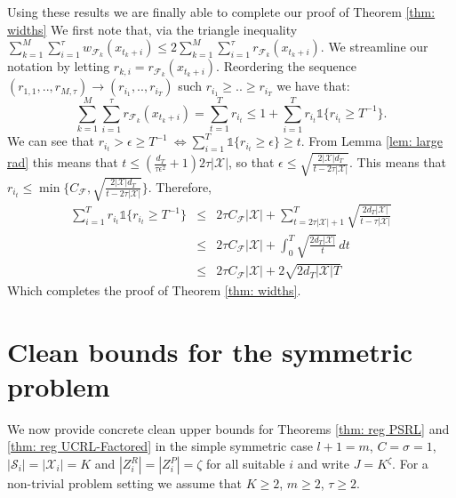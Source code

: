 \documentclass{article}
\newcommand{\Ind}{\mathds{1}}
\newcommand{\Xc}{\mathcal{X}}
\newcommand{\Fc}{\mathcal{F}}
\newcommand{\Sc}{\mathcal{S}}
\begin{document}
Using these results we are finally able to complete our proof of Theorem \ref{thm: widths}
We first note that, via the triangle inequality $ \sum_{k=1}^M \sum_{i=1}^\tau w_{\mathcal{F}_{k}}(x_{t_k+i}) \le 2 \sum_{k=1}^M \sum_{i=1}^\tau r_{\mathcal{F}_{k}}(x_{t_k+i})$.
We streamline our notation by letting $r_{k,i} = r_{\mathcal{F}_{k}}(x_{t_k+i}) $.
Reordering the sequence $(r_{1,1}, .. , r_{M,\tau}) \rightarrow (r_{i_1}, .. ,r_{i_T})$ such $r_{i_1} \ge .. \ge r_{i_T}$ we have that:
$$ \sum_{k=1}^M \sum_{i=1}^\tau r_{\mathcal{F}_{k}}(x_{t_k+i})  = \sum_{t=1}^T r_{i_t} \le 1 + \sum_{i=1}^T r_{i_t} \Ind \{ r_{i_t} \ge T^{-1} \}. $$
We can see that $r_{i_t} > \epsilon \ge T^{-1} \ \iff \sum_{i=1}^T \Ind \{ r_{i_t} \ge \epsilon\} \ge t$.
From Lemma \ref{lem: large rad} this means that $t \le \left( \frac{d_T}{\tau \epsilon^2} + 1 \right) 2\tau |\Xc|$, so that 
$\epsilon \le \sqrt{ \frac{2|\Xc| d_T}{t- 2\tau |\Xc|} }$.
This means that $r_{i_t} \le \min \{ C_\Fc , \sqrt{ \frac{2|\Xc| d_T}{t- 2\tau |\Xc|} } \}$. 
Therefore,
\begin{eqnarray*}
	\sum_{i=1}^T r_{i_t} \Ind \{ r_{i_t} \ge T^{-1} \}
	&\le& 2\tau C_\Fc |\Xc| + \sum_{t=2\tau |\Xc| +1}^T \sqrt{\frac{2d_T |\Xc|}{t - \tau |\Xc|}} \\
	&\le& 2\tau C_\Fc |\Xc| +  \int_0^T \sqrt{ \frac{2d_T |\Xc|}{t} } \,dt \\
	&\le& 2\tau C_\Fc |\Xc| + 2 \sqrt{2d_T |\Xc| T}
\end{eqnarray*}
Which completes the proof of Theorem \ref{thm: widths}.





\section{Clean bounds for the symmetric problem}
\label{sec: Clean symmetric bounds}
We now provide concrete clean upper bounds for Theorems \ref{thm: reg PSRL} and \ref{thm: reg UCRL-Factored} in the simple symmetric case
$l+1=m$, $C=\sigma=1$, $| \Sc_i | = |\Xc_i | = K$ and $|Z^R_i| = |Z^P_i | = \zeta$ for all suitable $i$ and write $J = K^\zeta$.
For a non-trivial problem setting we assume that $K \ge 2$, $m\ge2$, $\tau \ge 2$.
\end{document}
